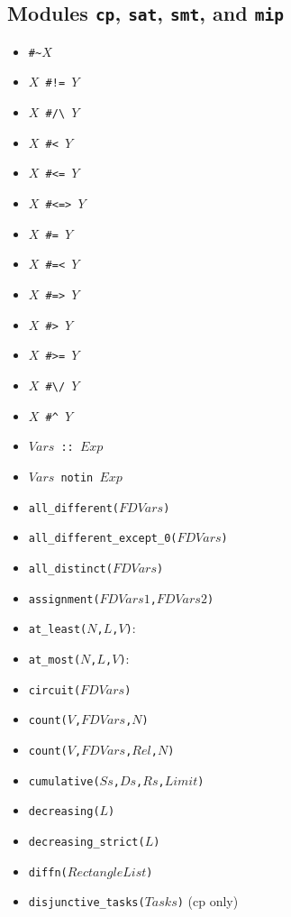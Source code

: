 \documentclass[10pt]{article}
\begin{document}
\begin{multicols}{2}
\section*{Modules \texttt{cp}, \texttt{sat}, \texttt{smt}, and \texttt{mip}}
\begin{scriptsize}
\begin{itemize}
    \item {\tt \verb+#~+$X$}
    \item {\tt $X$ \verb+#!=+ $Y$} 
    \item {\tt $X$ \verb+#/\+ $Y$}
    \item {\tt $X$ \verb+#<+ $Y$} 
    \item {\tt $X$ \verb+#<=+ $Y$}
    \item {\tt $X$ \verb+#<=>+ $Y$}
    \item {\tt $X$ \verb+#=+ $Y$} 
    \item {\tt $X$ \verb+#=<+ $Y$} 
    \item {\tt $X$ \verb+#=>+ $Y$}
    \item {\tt $X$ \verb+#>+ $Y$} 
    \item {\tt $X$ \verb+#>=+ $Y$} 
    \item {\tt $X$ \verb+#\/+ $Y$}
    \item {\tt $X$ \verb+#^+ $Y$}
\item \texttt{$Vars$ :: $Exp$}
\item \texttt{$Vars$ notin $Exp$}
\item \texttt{all\_different($FDVars$)}
\item \texttt{all\_different\_except\_0($FDVars$)}
\item \texttt{all\_distinct($FDVars$)}
\item \texttt{assignment($FDVars1$,$FDVars2$)}
\item \texttt{at\_least($N$,$L$,$V$)}:
\item \texttt{at\_most($N$,$L$,$V$)}: 
\item \texttt{circuit($FDVars$)}
\item \texttt{count($V$,$FDVars$,$N$)}
\item \texttt{count($V$,$FDVars$,$Rel$,$N$)}
\item \texttt{cumulative($Ss$,$Ds$,$Rs$,$Limit$)}
\item \texttt{decreasing($L$)}
\item \texttt{decreasing\_strict($L$)}
\item \texttt{diffn($RectangleList$)}
\item \texttt{disjunctive\_tasks($Tasks$)} (cp only)

\end{itemize}
\end{scriptsize}
\end{multicols}
\end{document}
